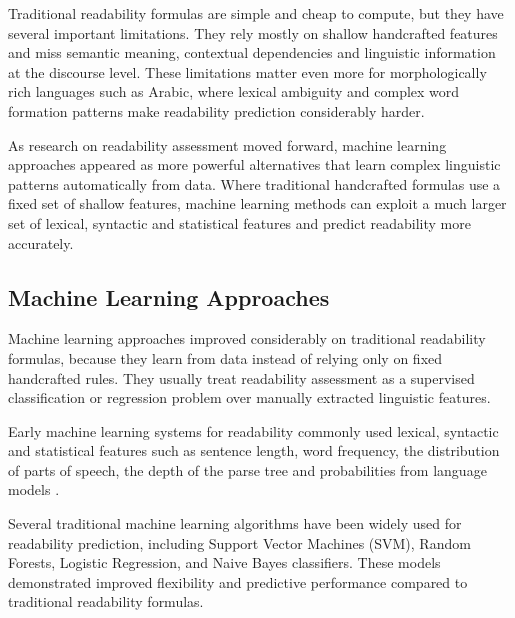 \documentclass[12pt]{report}
\begin{document}
\vspace{0.3cm}


Traditional readability formulas are simple and cheap to compute, but they have several important limitations. They rely mostly on shallow handcrafted features and miss semantic meaning, contextual dependencies and linguistic information at the discourse level. These limitations matter even more for morphologically rich languages such as Arabic, where lexical ambiguity and complex word formation patterns make readability prediction considerably harder\cite{habash2010introduction}.

As research on readability assessment moved forward, machine learning approaches appeared as more powerful alternatives that learn complex linguistic patterns automatically from data. Where traditional handcrafted formulas use a fixed set of shallow features, machine learning methods can exploit a much larger set of lexical, syntactic and statistical features and predict readability more accurately.
\subsection{Machine Learning Approaches}

Machine learning approaches improved considerably on traditional readability formulas, because they learn from data instead of relying only on fixed handcrafted rules. They usually treat readability assessment as a supervised classification or regression problem over manually extracted linguistic features.

Early machine learning systems for readability commonly used lexical, syntactic and statistical features such as sentence length, word frequency, the distribution of parts of speech, the depth of the parse tree and probabilities from language models \cite{schwarm2005reading}.

Several traditional machine learning algorithms have been widely used for readability prediction, including Support Vector Machines (SVM), Random Forests, Logistic Regression, and Naive Bayes classifiers. These models demonstrated improved flexibility and predictive performance compared to traditional readability formulas.
\end{document}

